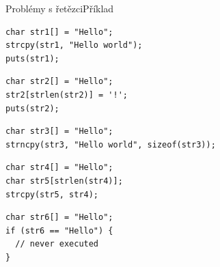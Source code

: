 \begin{frame}[fragile]{Problémy s řetězci}{Příklad}

\begin{lstlisting}
char str1[] = "Hello";
strcpy(str1, "Hello world");
puts(str1);
\end{lstlisting}
\pause
\begin{lstlisting}
char str2[] = "Hello";
str2[strlen(str2)] = '!';
puts(str2);
\end{lstlisting}
\pause
\begin{lstlisting}
char str3[] = "Hello";
strncpy(str3, "Hello world", sizeof(str3));
\end{lstlisting}
\pause
\begin{lstlisting}
char str4[] = "Hello";
char str5[strlen(str4)];
strcpy(str5, str4);
\end{lstlisting}
\pause
\begin{lstlisting}
char str6[] = "Hello";
if (str6 == "Hello") {
  // never executed
}
\end{lstlisting}

\end{frame}


